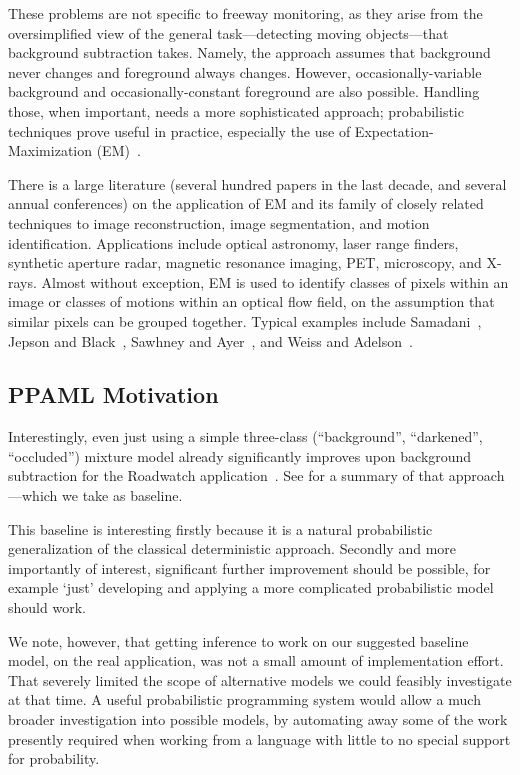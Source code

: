 These problems are not specific to freeway monitoring, as they arise
from the oversimplified view of the
general task---detecting moving objects---that
background subtraction takes.  Namely, the approach assumes that
background never changes and foreground always changes.  However,
occasionally-variable background and occasionally-constant
foreground are also possible.  Handling those, when important, needs a
more sophisticated approach; probabilistic techniques prove useful in practice,
especially the use of Expectation-Maximization (EM)~\cite{Dempster+al:1977}.

There is a large literature (several hundred papers in the last
decade, and several annual conferences) on the application
of EM and its family of closely related techniques
to image reconstruction, image segmentation, and
motion identification.   Applications include optical astronomy, laser
range finders, synthetic aperture radar, magnetic resonance imaging, PET, microscopy, and
X-rays.  Almost without exception, EM is used to identify classes of
pixels within an image or classes of motions within an optical flow
field, on the assumption that similar pixels can be grouped
together. Typical examples include Samadani~\cite{Samadani:1995},
Jepson and Black~\cite{Jepson+Black:1993}, Sawhney and
Ayer~\cite{Sawhney+Ayer:1996}, and Weiss and
Adelson~\cite{Weiss+Adelson:1996}.

\subsection{PPAML Motivation}

Interestingly, even just using a simple three-class (``background'', ``darkened'',
``occluded'') mixture model already significantly improves upon
background subtraction for the Roadwatch application~\cite{friedman1997image}.  See
 for a summary of
that approach---which we take as baseline.

This baseline is interesting firstly because it is a natural
probabilistic generalization of the 
classical deterministic approach.
Secondly and more importantly of interest, significant further
improvement should be possible, for example `just' developing and
applying a more complicated probabilistic model should work.

We note, however, that getting inference to work on our suggested baseline
model, on the real application, was not a small amount of
implementation effort.  That severely limited the scope of alternative models we could
feasibly investigate at that time.  A useful probabilistic programming
system would allow a much broader investigation into possible models,
by automating away some of the work presently required when working
from a language with little to no special support for probability.


